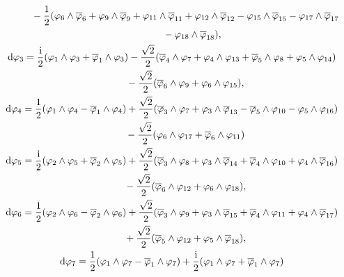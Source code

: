 \documentclass[pdftex]{sigma}
\numberwithin{equation}{section}
\begin{document}
\begin{Example}
\begin{gather*}
\hphantom{{\rm d} \varphi_2 =}{}
 - \frac{1}{2} ( \varphi_6 \wedge \overline \varphi_6 + \varphi_9 \wedge \overline \varphi_9 + \varphi_{11} \wedge \overline \varphi_{11} + \varphi_{12} \wedge \overline \varphi_{12} - \varphi_{15} \wedge \overline \varphi_{15} -\varphi_{17} \wedge \overline \varphi_{17}\\
\hphantom{{\rm d} \varphi_2 =\frac{{\rm i}}{2} (}{}
 -\varphi_{18} \wedge \overline \varphi_{18}),\\
{\rm d} \varphi_3 = \frac{{\rm i}}{2} (\varphi_1 \wedge \varphi_3+ \overline \varphi_1 \wedge \varphi_3) - \frac{\sqrt{2}}{2} ( \overline \varphi_4 \wedge \varphi_7 + \varphi_4 \wedge \varphi_{13} + \overline \varphi_5 \wedge \varphi_8 + \varphi_5 \wedge \varphi_{14} )\\
\hphantom{{\rm d} \varphi_{9} =}{} - \frac{\sqrt{2}}{2} (\overline \varphi_6 \wedge \varphi_9 + \varphi_6 \wedge \varphi_{15}),\\
{\rm d} \varphi_4 = \frac{1}{2} (\varphi_1 \wedge \varphi_4 - \overline \varphi_1 \wedge \varphi_4)+ \frac{\sqrt{2}}{2} (\overline \varphi_3 \wedge \varphi_7 + \varphi_3 \wedge \overline \varphi_{13} - \overline \varphi_5 \wedge \varphi_{10} - \varphi_5 \wedge \varphi_{16} )\\
\hphantom{{\rm d} \varphi_{9} =}{} - \frac{\sqrt{2}}{2} (\varphi_6 \wedge \varphi_{17} + \overline \varphi_6 \wedge \varphi_{11})\\
{\rm d} \varphi_5 = \frac{{\rm i}}{2} (\varphi_2 \wedge \varphi_5+ \overline \varphi_2 \wedge \varphi_5) + \frac{\sqrt{2}}{2} ( \overline \varphi_3 \wedge \varphi_8 + \varphi_3 \wedge \overline \varphi_{14} + \overline \varphi_4 \wedge \varphi_{10} + \varphi_4 \wedge \overline \varphi_{16} )\\
\hphantom{{\rm d} \varphi_{9} =}{} - \frac{\sqrt{2}}{2} (\overline \varphi_6 \wedge \varphi_{12} + \varphi_6 \wedge \varphi_{18}),\\
{\rm d} \varphi_6 = \frac{1}{2} (\varphi_2 \wedge \varphi_6- \overline \varphi_2 \wedge \varphi_6) + \frac{\sqrt{2}}{2} ( \overline \varphi_3 \wedge \varphi_9 + \varphi_3 \wedge \overline \varphi_{15} + \overline \varphi_4 \wedge \varphi_{11} + \varphi_4 \wedge \overline \varphi_{17} )\\
\hphantom{{\rm d} \varphi_{9} =}{} + \frac{\sqrt{2}}{2} (\overline \varphi_5 \wedge \varphi_{12} + \varphi_5 \wedge \overline \varphi_{18}),\\
{\rm d} \varphi_7 = \frac{1}{2} (\varphi_1 \wedge \varphi_7 - \overline \varphi_1 \wedge \varphi_7) + \frac{{\rm i}}{2} ( \varphi_1 \wedge \varphi_7 + \overline \varphi_1 \wedge \varphi_7)\\

\end{gather*}
\end{Example}
\end{document}
